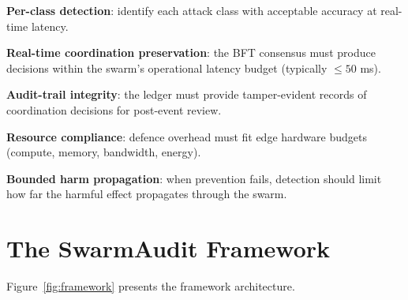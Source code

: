 \documentclass[sigconf,nonacm]{acmart}
\begin{document}
\textbf{Per-class detection}: identify each attack class with
acceptable accuracy at real-time latency.

\textbf{Real-time coordination preservation}: the BFT consensus
must produce decisions within the swarm's operational latency
budget (typically $\leq 50$ ms).

\textbf{Audit-trail integrity}: the ledger must provide
tamper-evident records of coordination decisions for post-event
review.

\textbf{Resource compliance}: defence overhead must fit edge
hardware budgets (compute, memory, bandwidth, energy).

\textbf{Bounded harm propagation}: when prevention fails,
detection should limit how far the harmful effect propagates
through the swarm.

\section{The SwarmAudit Framework}

Figure~\ref{fig:framework} presents the framework architecture.
\end{document}
